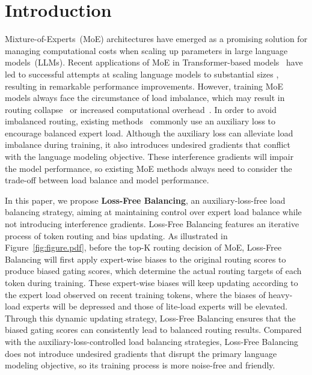 \documentclass{article} %
\newcommand{\ours}{Loss-Free Balancing}
\newcommand{\Ours}{Loss-Free Balancing}
\begin{document}
\section{Introduction}
Mixture-of-Experts~(MoE) architectures have emerged as a promising solution for managing computational costs when scaling up parameters in large language models~(LLMs). 
Recent applications of MoE in Transformer-based models~\citep{Vaswani2017AttentionIA} have led to successful attempts at scaling language models to substantial sizes \citep{Shao2024DeepSeekV2AS,DeepSeekAI2024DeepSeekCoderV2BT,Dai2024DeepSeekMoETU,Fedus2021SwitchTS,Lepikhin2020GShardSG}, resulting in remarkable performance improvements. 
However, training MoE models always face the circumstance of load imbalance, which may result in routing collapse~\citep{Shazeer2017OutrageouslyLN} or increased computational overhead~\citep{Fedus2021SwitchTS,Lepikhin2020GShardSG,Shazeer2017OutrageouslyLN}. 
In order to avoid imbalanced routing, existing methods~\citep{Fedus2021SwitchTS,Lepikhin2020GShardSG} commonly use an auxiliary loss to encourage balanced expert load.
Although the auxiliary loss can alleviate load imbalance during training, it also introduces undesired gradients that conflict with the language modeling objective. 
These interference gradients will impair the model performance, so existing MoE methods always need to consider the trade-off between load balance and model performance. 

In this paper, we propose \textbf{\ours{}}, an auxiliary-loss-free load balancing strategy, aiming at maintaining control over expert load balance while not introducing interference gradients. 
\Ours{} features an iterative process of token routing and bias updating. 
As illustrated in Figure~\ref{fig:figure.pdf}, before the top-K routing decision of MoE, \ours{} will first apply expert-wise biases to the original routing scores to produce biased gating scores, which determine the actual routing targets of each token during training. 
These expert-wise biases will keep updating according to the expert load observed on recent training tokens, where the biases of heavy-load experts will be depressed and those of lite-load experts will be elevated. 
Through this dynamic updating strategy, \ours{} ensures that the biased gating scores can consistently lead to balanced routing results. 
Compared with the auxiliary-loss-controlled load balancing strategies, \ours{} does not introduce undesired gradients that disrupt the primary language modeling objective, so its training process is more noise-free and friendly. 
\end{document}
